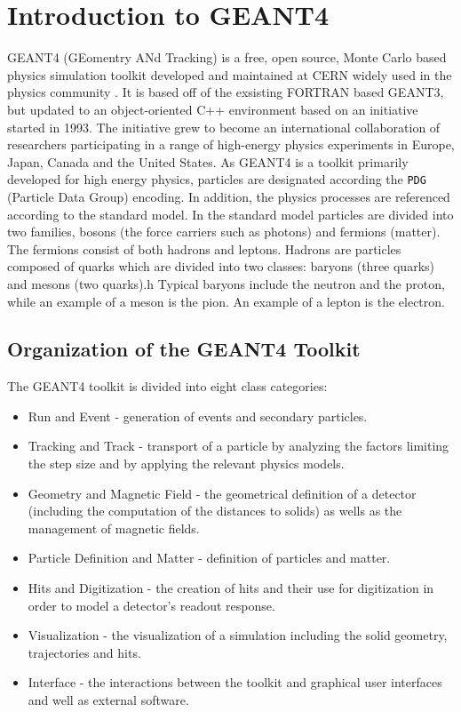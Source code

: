 \section{Introduction to GEANT4}
\label{sec:G4Intro}

GEANT4 (GEomentry ANd Tracking) is a free, open source, Monte Carlo based physics simulation toolkit developed and maintained at CERN widely used in the physics community \cite{agostinelli_geant4simulation_2003,geant4_collaboration_geant4_2011,allison_geant4_2006}.
It is based off of the exsisting FORTRAN based GEANT3, but updated to an object-oriented C++ environment based on an initiative started in 1993.
The initiative grew to become an international collaboration of researchers participating in a range of high-energy physics experiments in Europe, Japan, Canada and the United States. 
As GEANT4 is a toolkit primarily developed for high energy physics, particles are designated according the \verb+PDG+ (Particle Data Group) encoding.
In addition, the physics processes are referenced according to the standard model.
In the standard model particles are divided into two families, bosons (the force carriers such as photons) and fermions (matter).
The fermions consist of both hadrons and leptons.
Hadrons are particles composed of quarks which are divided into two classes: baryons (three quarks) and mesons (two quarks).h
Typical baryons include the neutron and the proton, while an example of a meson is the pion.
An example of a lepton is the electron.
\subsection{Organization of the GEANT4 Toolkit}

The GEANT4 toolkit is divided into eight class categories:
\begin{itemize}
    \item Run and Event - generation of events and secondary particles.
    \item Tracking and Track - transport of a particle by analyzing the factors limiting the step size and by applying the relevant physics models.
    \item Geometry and Magnetic Field - the geometrical definition of a detector (including the computation of the distances to solids) as wells as the management of magnetic fields.
    \item Particle Definition and Matter - definition of particles and matter.
    \item Hits and Digitization - the creation of hits and their use for digitization in order to model a detector's readout response.
    \item Visualization - the visualization of a simulation including the solid geometry, trajectories and hits.
    \item Interface - the interactions between the toolkit and graphical user interfaces and well as external software.
\end{itemize}

